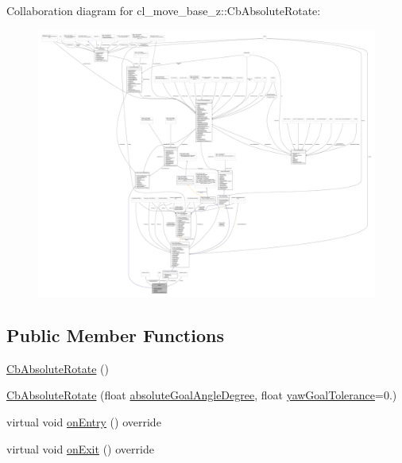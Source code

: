 Collaboration diagram for cl\+\_\+move\+\_\+base\+\_\+z\+:\+:Cb\+Absolute\+Rotate\+:
\nopagebreak
\begin{figure}[H]
\begin{center}
\leavevmode
\includegraphics[width=350pt]{classcl__move__base__z_1_1CbAbsoluteRotate__coll__graph}
\end{center}
\end{figure}
\subsection*{Public Member Functions}
\begin{DoxyCompactItemize}
\item 
\hyperlink{classcl__move__base__z_1_1CbAbsoluteRotate_a378516095c2ad66f52e50f6d7c32678e}{Cb\+Absolute\+Rotate} ()
\item 
\hyperlink{classcl__move__base__z_1_1CbAbsoluteRotate_ac2149ffade91cd127e476b3ece3300dd}{Cb\+Absolute\+Rotate} (float \hyperlink{classcl__move__base__z_1_1CbAbsoluteRotate_ad5d0e21549940444e1cb525cda73329a}{absolute\+Goal\+Angle\+Degree}, float \hyperlink{classcl__move__base__z_1_1CbAbsoluteRotate_a8d8b5b9c2c821efe101bb07c96c4bdd3}{yaw\+Goal\+Tolerance}=0.)
\item 
virtual void \hyperlink{classcl__move__base__z_1_1CbAbsoluteRotate_a10418ea360809fa649d295716b152b2b}{on\+Entry} () override
\item 
virtual void \hyperlink{classcl__move__base__z_1_1CbAbsoluteRotate_a0e362b8e9f0d7de5aeee183ba4031437}{on\+Exit} () override
\end{DoxyCompactItemize}
